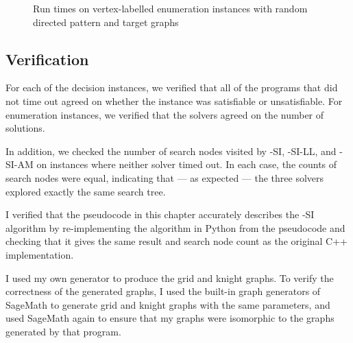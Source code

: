 \begin{figure}[htb]
    \centering
    \caption{Run times on vertex-labelled enumeration instances with random directed pattern and target graphs}
    \label{figure:labelled-vf-instance-runtimes}
\end{figure}

\subsection{Verification}

For each of the decision instances, we verified that all of the programs that did not time out
agreed on whether the instance was satisfiable or unsatisfiable.  For enumeration instances,
we verified that the solvers agreed on the number of solutions.

In addition, we checked the number of search nodes visited by \McSplit-SI,
\McSplit-SI-LL, and \McSplit-SI-AM
on instances where neither solver timed out.  In each case, the counts of search nodes were equal,
indicating that --- as expected --- the three solvers explored exactly the same search tree.

I verified that the pseudocode in this chapter accurately describes the \McSplit-SI
algorithm by re-implementing the algorithm in Python from the pseudocode and checking
that it gives the same result and search node count as the original C++ implementation.

I used my own generator to produce the grid and knight graphs.  To verify the
correctness of the generated graphs, I used the built-in graph generators of
SageMath \citep{sagemath} to generate grid and knight graphs with the same
parameters, and used SageMath again to ensure that my graphs were isomorphic to
the graphs generated by that program.

